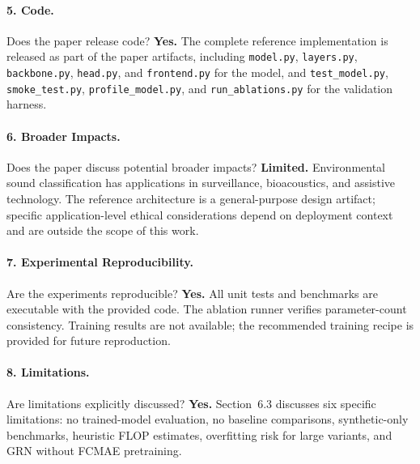 \documentclass{article}
\begin{document}
\paragraph{5. Code.}
Does the paper release code?
\textbf{Yes.} The complete reference implementation is released as part of the
paper artifacts, including \texttt{model.py}, \texttt{layers.py},
\texttt{backbone.py}, \texttt{head.py}, and \texttt{frontend.py} for the
model, and \texttt{test\_model.py}, \texttt{smoke\_test.py},
\texttt{profile\_model.py}, and \texttt{run\_ablations.py} for the validation
harness.

\paragraph{6. Broader Impacts.}
Does the paper discuss potential broader impacts?
\textbf{Limited.} Environmental sound classification has applications in
surveillance, bioacoustics, and assistive technology. The reference architecture
is a general-purpose design artifact; specific application-level ethical
considerations depend on deployment context and are outside the scope of this
work.

\paragraph{7. Experimental Reproducibility.}
Are the experiments reproducible?
\textbf{Yes.} All unit tests and benchmarks are executable with the provided
code. The ablation runner verifies parameter-count consistency. Training
results are not available; the recommended training recipe is provided for
future reproduction.

\paragraph{8. Limitations.}
Are limitations explicitly discussed?
\textbf{Yes.} Section~6.3 discusses six specific limitations: no trained-model
evaluation, no baseline comparisons, synthetic-only benchmarks, heuristic FLOP
estimates, overfitting risk for large variants, and GRN without FCMAE
pretraining.
\end{document}
